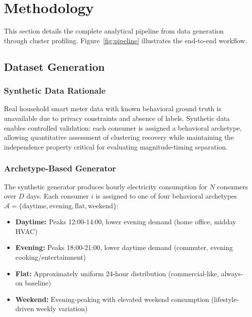\section{Methodology}
\label{sec:methodology}

This section details the complete analytical pipeline from data generation through cluster profiling. Figure~\ref{fig:pipeline} illustrates the end-to-end workflow.

\subsection{Dataset Generation}
\label{sec:dataset}

\subsubsection{Synthetic Data Rationale}

Real household smart meter data with known behavioral ground truth is unavailable due to privacy constraints and absence of labels. Synthetic data enables controlled validation: each consumer is assigned a behavioral archetype, allowing quantitative assessment of clustering recovery while maintaining the independence property critical for evaluating magnitude-timing separation.

\subsubsection{Archetype-Based Generator}

The synthetic generator produces hourly electricity consumption for $N$ consumers over $D$ days. Each consumer $i$ is assigned to one of four behavioral archetypes $\mathcal{A} = \{\text{daytime}, \text{evening}, \text{flat}, \text{weekend}\}$:

\begin{itemize}
    \item \textbf{Daytime:} Peaks 12:00-14:00, lower evening demand (home office, midday HVAC)
    \item \textbf{Evening:} Peaks 18:00-21:00, lower daytime demand (commuter, evening cooking/entertainment)
    \item \textbf{Flat:} Approximately uniform 24-hour distribution (commercial-like, always-on baseline)
    \item \textbf{Weekend:} Evening-peaking with elevated weekend consumption (lifestyle-driven weekly variation)
\end{itemize}

